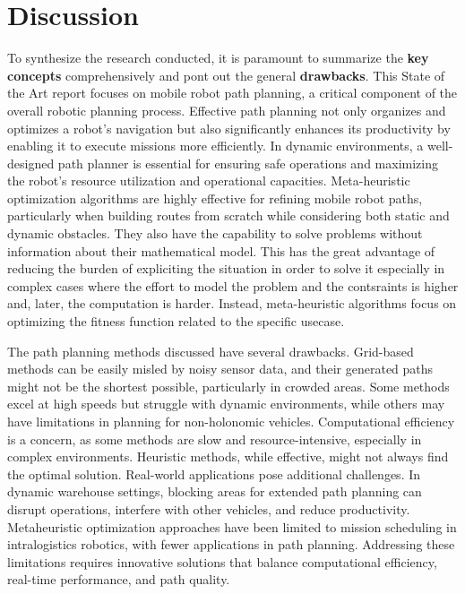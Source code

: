 \section{Discussion} %
To synthesize the research conducted, it is paramount to summarize the \textbf{key concepts} comprehensively and 
pont out the general \textbf{drawbacks}. This 
State of the Art report focuses on mobile robot path planning, a critical component of the overall 
robotic planning process. Effective path planning not only organizes and optimizes a robot's navigation 
but also significantly enhances its productivity by enabling it to execute missions more efficiently. 
In dynamic environments, a well-designed path planner is essential for ensuring safe operations and 
maximizing the robot's resource utilization and operational capacities.
Meta-heuristic optimization algorithms are highly effective for refining mobile robot paths, particularly 
when building routes from scratch while considering both static and dynamic obstacles.
They also have the capability to solve problems without information about their mathematical model.
This has the great advantage of reducing the burden of expliciting the situation in order to solve it especially 
in complex cases where the effort to model the problem and the contsraints is higher and, later, the computation 
is harder. Instead, meta-heuristic algorithms focus on optimizing the fitness function related to the specific 
usecase. 

The path planning methods discussed have several drawbacks. Grid-based methods can be easily misled by noisy 
sensor data, and their generated paths might not be the shortest possible, particularly in crowded areas. 
Some methods excel at high speeds but struggle with dynamic environments, while others may have limitations 
in planning for non-holonomic vehicles. Computational efficiency is a concern, as some methods are slow and 
resource-intensive, especially in complex environments. Heuristic methods, while effective, might not always 
find the optimal solution. Real-world applications pose additional challenges. In dynamic warehouse settings, 
blocking areas for extended path planning can disrupt operations, interfere with other vehicles, and reduce 
productivity. Metaheuristic optimization approaches have been limited to mission scheduling in intralogistics 
robotics, with fewer applications in path planning. Addressing these limitations requires innovative solutions 
that balance computational efficiency, real-time performance, and path quality.

